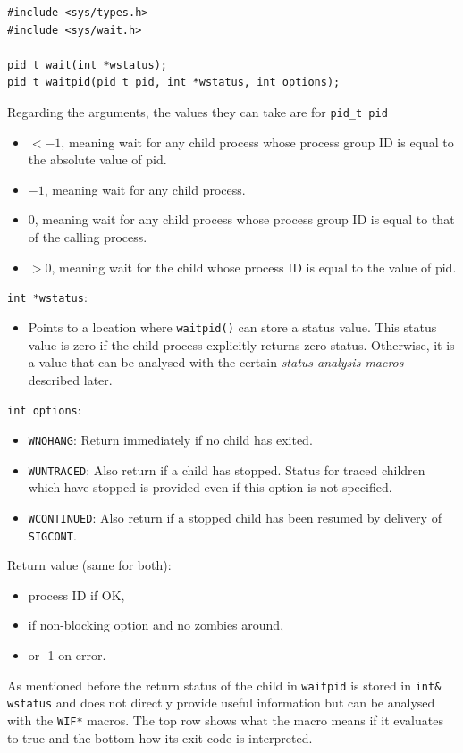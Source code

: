 \documentclass[a4paper]{article}
\begin{document}
\begin{verbatim}
#include <sys/types.h>
#include <sys/wait.h>

pid_t wait(int *wstatus);
pid_t waitpid(pid_t pid, int *wstatus, int options);
\end{verbatim}
Regarding the arguments, the values they can take are for \texttt{pid\_t pid} 
\begin{itemize}
    \item $<-1$, meaning wait for any child process whose process group ID is equal to the absolute value of pid.
    \item $-1$, meaning wait for any child process.
    \item 0, meaning wait for any child process whose process group ID is
              equal to that of the calling process.
    \item $> 0$, meaning wait for the child whose process ID is equal to the value of pid.
\end{itemize}
\texttt{int *wstatus}:
\begin{itemize}
    \item Points to a location where \texttt{waitpid()} can store a status value. This status value is zero if the child process explicitly returns zero status. Otherwise, it is a value that can be analysed with the certain \textit{status analysis macros} described later.
\end{itemize}
\texttt{int options}:
\begin{itemize}
    \item \texttt{WNOHANG}: Return immediately if no child has exited.
    \item \texttt{WUNTRACED}: Also return if a child has stopped. Status for traced children which have stopped is provided even if this option is not specified.
    \item \texttt{WCONTINUED}: Also return if a stopped child has been resumed by delivery of \texttt{SIGCONT}.
\end{itemize}
Return value (same for both):
\begin{itemize}
    \item process ID if OK,
    \item if non-blocking option and no zombies around,
    \item or -1 on error.
\end{itemize}
As mentioned before the return status of the child in \texttt{waitpid} is stored in \texttt{int\& wstatus} and does not directly provide useful information but can be analysed with the \texttt{WIF*} macros. The top row shows what the macro means if it evaluates to true and the bottom how its exit code is interpreted.
\end{document}
